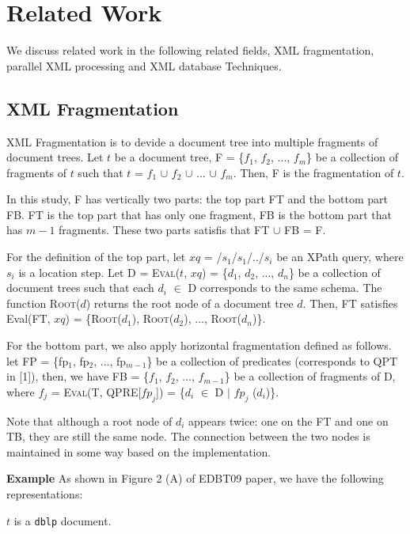 
\chapter{Related Work}
\label{sec:relatedwork}

We discuss related work in the following related fields, XML fragmentation,
parallel XML processing and XML database Techniques.

\section{XML Fragmentation} 

XML Fragmentation is to devide a document tree into multiple fragments of
document trees. Let $t$ be a document tree, F = \{$f_1$, $f_2$, ..., $f_m$\} be
a collection of fragments of $t$ such that $t$ = $f_1$ $\cup$ $f_2$ $\cup$ ...
$\cup$ $f_m$. Then, F is the fragmentation of $t$.

In this study, F has vertically two parts: the top part FT and the bottom part
FB. FT is the top part that has only one fragment, FB is the bottom part that
has $m-1$ fragments. These two parts satisfis that FT $\cup$ FB = F.

For the definition of the top part, let $xq$ = /$s_1$/$s_1$/../$s_i$ be an XPath
query, where $s_i$ is a location step. Let D = \textsc{Eval}($t$, $xq$) =
\{$d_1$, $d_2$, ..., $d_n$\} be a collection of document trees such that each
$d_i$ $\in$ D corresponds to the same schema. The function \textsc{Root}($d$)
returns the root node of a document tree $d$.  Then, FT satisfies Eval(FT, $xq$) =
\{\textsc{Root}($d_1$), \textsc{Root}($d_2$), ..., \textsc{Root}($d_n$)\}.

For the bottom part, we also apply horizontal fragmentation defined as follows.
let FP = \{fp$_1$, fp$_2$, ..., fp$_{m-1}$\} be a collection of predicates
(corresponds to QPT in [1]), then, we have FB = \{$f_1$, $f_2$, ..., $f_{m-1}$\}
be a collection of fragments of D, where $f_j$ = \textsc{Eval}(T, QPRE[$fp_j$]) =
\{$d_i$ $\in$ D $|$ $fp_j$ ($d_i$)\}.

Note that although a root node of $d_i$ appears twice: one on the FT and one on
TB, they are still the same node. The connection between the two nodes is
maintained in some way based on the implementation.

\textbf{Example}
As shown in Figure 2 (A) of EDBT09 paper, we have the following \\representations:

$t$ is a \texttt{dblp} document.

